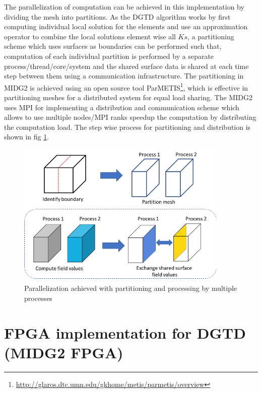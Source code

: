 The parallelization of computation can be achieved in this implementation by dividing
the mesh into partitions. As the \ac{DGTD} algorithm works by first computing individual
local solution for the elements and use an approximation operator to combine the local
solutions element wise all $Ks$,
a partitioning scheme which uses surfaces as boundaries can be performed such that,
computation of each individual partition is performed by a separate
process/thread/core/system and the shared surface data is shared at each time step
between them using a communication infrastructure. The partitioning in MIDG2 is
achieved using an open source tool ParMETIS\footnote{\url{http://glaros.dtc.umn.edu/gkhome/metis/parmetis/overview}},
which is effective in partitioning meshes for a distributed system for equal load sharing.
The MIDG2 uses \ac{MPI} for implementing a distribution and communication scheme which
allows to use multiple nodes/MPI ranks speedup the computation by distributing the computation load.
The step wise process for partitioning and distribution is shown in fig \ref{fig:partitioning}.
\begin{figure}[h]%
    \centering
    \includegraphics[width=0.9\textwidth]{images/partition_proc}
    \caption{Parallelization achieved with partitioning and processing by multiple processes}
    \label{fig:partitioning}
\end{figure}

\section{FPGA implementation for DGTD (MIDG2 FPGA)}
\label{sec:fpga_dg}

